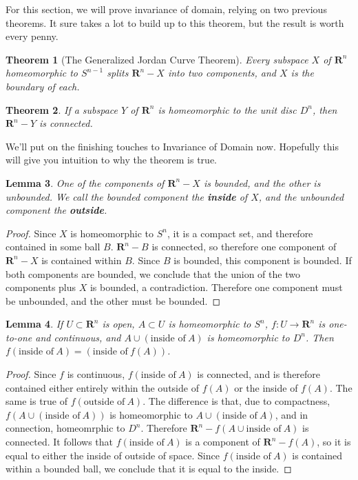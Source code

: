 \documentclass[12pt]{report}
\theoremstyle{plain}
\newtheorem{theorem}{Theorem}[chapter]
\newtheorem{lemma}[theorem]{Lemma}
\theoremstyle{definition}
\begin{document}
For this section, we will prove invariance of domain, relying on two previous theorems. It sure takes a lot to build up to this theorem, but the result is worth every penny.

\begin{theorem}[The Generalized Jordan Curve Theorem]
    Every subspace $X$ of $\mathbf{R}^n$ homeomorphic to $S^{n-1}$ splits $\mathbf{R}^n - X$ into two components, and $X$ is the boundary of each.
\end{theorem}

\begin{theorem}
    If a subspace $Y$ of $\mathbf{R}^n$ is homeomorphic to the unit disc $D^n$, then $\mathbf{R}^n - Y$ is connected.
\end{theorem}

We'll put on the finishing touches to Invariance of Domain now. Hopefully this will give you intuition to why the theorem is true.

\begin{lemma}
    One of the components of $\mathbf{R}^n - X$ is bounded, and the other is unbounded. We call the bounded component the {\bf inside} of $X$, and the unbounded component the {\bf outside}.
\end{lemma}
\begin{proof}
    Since $X$ is homeomorphic to $S^n$, it is a compact set, and therefore contained in some ball $B$. $\mathbf{R}^n - B$ is connected, so therefore one component of $\mathbf{R}^n - X$ is contained within $B$. Since $B$ is bounded, this component is bounded. If both components are bounded, we conclude that the union of the two components plus $X$ is bounded, a contradiction. Therefore one component must be unbounded, and the other must be bounded.
\end{proof}

\begin{lemma}
    If $U \subset \mathbf{R}^n$ is open, $A \subset U$ is homeomorphic to $S^n$, $f:U \to \mathbf{R}^n$ is one-to-one and continuous, and $A \cup (\text{inside of}\ A)$ is homeomorphic to $D^n$. Then $f(\text{inside of}\ A) = (\text{inside of}\ f(A))$.
\end{lemma}
\begin{proof}
    Since $f$ is continuous, $f(\text{inside of}\ A)$ is connected, and is therefore contained either entirely within the outside of $f(A)$ or the inside of $f(A)$. The same is true of $f(\text{outside of}\ A)$. The difference is that, due to compactness, $f(A \cup (\text{inside of}\ A))$ is homeomorphic to $A \cup (\text{inside of}\ A)$, and in connection, homeomrphic to $D^n$. Therefore $\mathbf{R}^n - f(A \cup \text{inside of}\ A)$ is connected. It follows that $f(\text{inside of}\ A)$ is a component of $\mathbf{R}^n - f(A)$, so it is equal to either the inside of outside of space. Since $f(\text{inside of}\ A)$ is contained within a bounded ball, we conclude that it is equal to the inside.
\end{proof}
\end{document}
